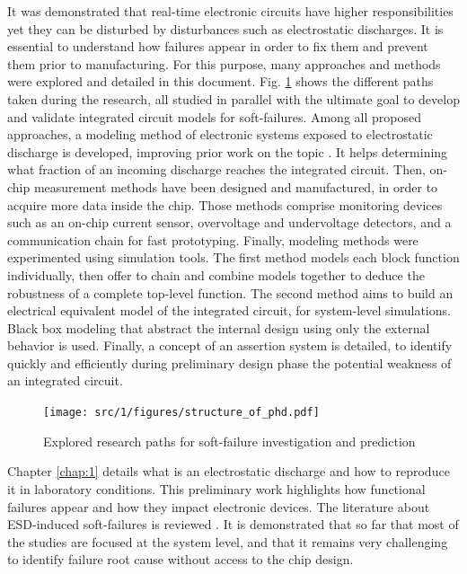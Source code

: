 It was demonstrated that real-time electronic circuits have higher responsibilities yet they can be disturbed by disturbances such as electrostatic discharges.
It is essential to understand how failures appear in order to fix them and prevent them prior to manufacturing.
For this purpose, many approaches and methods were explored and detailed in this document.
Fig. \ref{fig:phd-map} shows the different paths taken during the research, all studied in parallel with the ultimate goal to develop and validate integrated circuit models for soft-failures.
Among all proposed approaches, a modeling method of electronic systems exposed to electrostatic discharge is developed, improving prior work on the topic \cite{phd-lacrampe, phd-monnereau}.
It helps determining what fraction of an incoming discharge reaches the integrated circuit.
Then, on-chip measurement methods have been designed and manufactured, in order to acquire more data inside the chip.
Those methods comprise monitoring devices such as an on-chip current sensor, overvoltage and undervoltage detectors, and a communication chain for fast prototyping.
Finally, modeling methods were experimented using simulation tools.
The first method models each block function individually, then offer to chain and combine models together to deduce the robustness of a complete top-level function.
The second method aims to build an electrical equivalent model of the integrated circuit, for system-level simulations.
Black box modeling that abstract the internal design using only the external behavior is used.
Finally, a concept of an assertion system is detailed, to identify quickly and efficiently during preliminary design phase the potential weakness of an integrated circuit.

\begin{figure}[!h]
  \centering
  \texttt{[image: src/1/figures/structure\_of\_phd.pdf]}
  \caption{Explored research paths for soft-failure investigation and prediction}
  \label{fig:phd-map}
\end{figure}

%
Chapter \ref{chap:1} details what is an electrostatic discharge and how to reproduce it in laboratory conditions.
This preliminary work highlights how functional failures appear and how they impact electronic devices.
The literature about ESD-induced soft-failures is reviewed .
It is demonstrated that so far that most of the studies are focused at the system level, and that it remains very challenging to identify failure root cause without access to the chip design.

